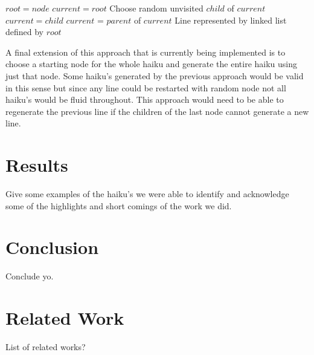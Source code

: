 \documentclass[]{article}
\begin{document}
\begin{algorithm}[H]
	\caption{$Depth\_First\_Search(node, n)$} \label{DFSB_WithStart}
	\begin{algorithmic}[1]
		\State $root = node$
		\State $current = root$
		\State Choose random unvisited $child$ of $current$
		\State $current = child$
		\EndIf
		\Else
		\Else
		\State $current$ = $parent$ of $current$
		\EndIf
		\EndIf
		\EndWhile
		\Return Line represented by linked list defined by $root$
	\end{algorithmic}
\end{algorithm}

A final extension of this approach that is currently being implemented is to choose a starting node for the whole haiku and generate the entire haiku using just that node. Some haiku's generated by the previous approach would be valid in this sense but since any line could be restarted with random node not all haiku's would be fluid throughout. This approach would need to be able to regenerate the previous line if the children of the last node cannot generate a new line.


\section{Results}
Give some examples of the haiku's we were able to identify and acknowledge some of the highlights and short comings of the work we did.

\section{Conclusion}
Conclude yo.

\section{Related Work}
List of related works?
\end{document}

